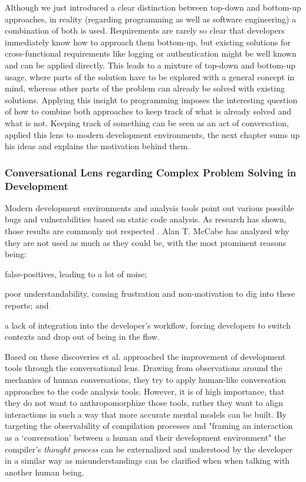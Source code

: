 %
Although we just introduced a clear distinction between top-down and bottom-up approaches, in reality (regarding programming as well as software engineering) a combination of both is used.
Requirements are rarely so clear that developers immediately know how to approach them bottom-up, but existing solutions for cross-functional requirements like logging or authentication might be well known and can be applied directly.
This leads to a mixture of top-down and bottom-up usage, where parts of the solution have to be explored with a general concept in mind, whereas other parts of the problem can already be solved with existing solutions.
Applying this insight to programming imposes the interesting question of how to combine both approaches to keep track of what is already solved and what is not.
Keeping track of something can be seen as an act of conversation, \citeauthor{mccabe_towards_2023} applied this lens to modern development environments, the next chapter sums up his ideas and explains the motivation behind them.


\subsubsection{Conversational Lens regarding Complex Problem Solving in Development}
\label{sec:conversational-lens}
Modern development environments and analysis tools point out various possible bugs and vulnerabilities based on static code analysis.
As research has shown, those results are commonly not respected \cite{mccabe_towards_2023}.
Alan T. McCabe has analyzed why they are not used as much as they could be, with the most prominent reasons being:
\begin{enumerate*}[label=(\roman*)]
\item false-positives, leading to a lot of noise;
\item poor understandability, causing frustration and non-motivation to dig into these reports; and
\item a lack of integration into the developer's workflow, forcing developers to switch contexts and drop out of being in the flow.
\end{enumerate*}
Based on these discoveries \citeauthor{mccabe_towards_2023} et al. approached the improvement of development tools through the conversational lens.
Drawing from observations around the mechanics of human conversations, they try to apply human-like conversation approaches to the code analysis tools.
However, it is of high importance, that they do not want to anthropomorphize those tools, rather they want to align interactions in such a way that more accurate mental models can be built.
By targeting the observability of compilation processes and "framing an interaction as a `conversation' between a human and their development environment" \cite{mccabe_towards_2023} the compiler's \emph{thought process} can be externalized and understood by the developer in a similar way as misunderstandings can be clarified when when talking with another human being.

